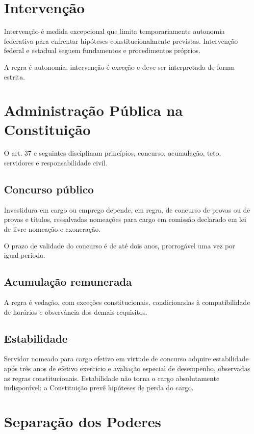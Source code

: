\section{Intervenção}

Intervenção é medida excepcional que limita temporariamente autonomia federativa para enfrentar hipóteses constitucionalmente previstas. Intervenção federal e estadual seguem fundamentos e procedimentos próprios.

A regra é autonomia; intervenção é exceção e deve ser interpretada de forma estrita.

\section{Administração Pública na Constituição}

O art. 37 e seguintes disciplinam princípios, concurso, acumulação, teto, servidores e responsabilidade civil.

\subsection{Concurso público}

Investidura em cargo ou emprego depende, em regra, de concurso de provas ou de provas e títulos, ressalvadas nomeações para cargo em comissão declarado em lei de livre nomeação e exoneração.

O prazo de validade do concurso é de até dois anos, prorrogável uma vez por igual período.

\subsection{Acumulação remunerada}

A regra é vedação, com exceções constitucionais, condicionadas à compatibilidade de horários e observância dos demais requisitos.

\subsection{Estabilidade}

Servidor nomeado para cargo efetivo em virtude de concurso adquire estabilidade após três anos de efetivo exercício e avaliação especial de desempenho, observadas as regras constitucionais. Estabilidade não torna o cargo absolutamente indisponível: a Constituição prevê hipóteses de perda do cargo.

\section{Separação dos Poderes}

